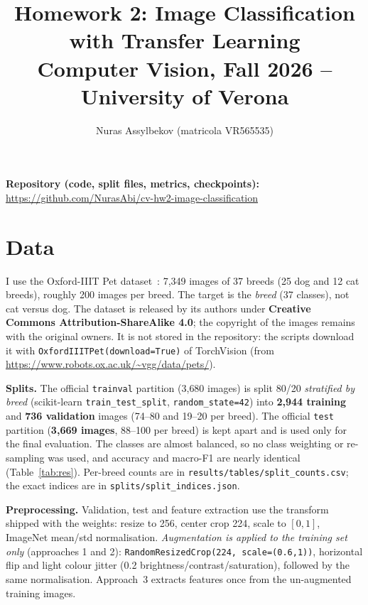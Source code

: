 \documentclass[10pt,a4paper]{article}
\title{\vspace{-1.2cm}\textbf{Homework 2: Image Classification with Transfer Learning}\\[2pt]
\large Computer Vision, Fall 2026 -- University of Verona}
\author{Nuras Assylbekov (matricola VR565535)}
\date{}
\begin{document}
\maketitle
\vspace{-0.8cm}
\noindent\textbf{Repository (code, split files, metrics, checkpoints):}\\
\url{https://github.com/NurasAbi/cv-hw2-image-classification}

\section{Data}
I use the Oxford-IIIT Pet dataset~\cite{parkhi2012}: 7{,}349 images of 37 breeds (25 dog and 12 cat breeds), roughly 200 images per breed.
The target is the \emph{breed} (37 classes), not cat versus dog. The dataset is released by its authors under
\textbf{Creative Commons Attribution-ShareAlike 4.0}; the copyright of the images remains with the original owners.
It is not stored in the repository: the scripts download it with \texttt{OxfordIIITPet(download=True)} of TorchVision
(from \url{https://www.robots.ox.ac.uk/~vgg/data/pets/}).

\textbf{Splits.} The official \texttt{trainval} partition (3{,}680 images) is split 80/20 \emph{stratified by breed}
(scikit-learn \texttt{train\_test\_split}, \texttt{random\_state=42}) into
\textbf{2{,}944 training} and \textbf{736 validation} images (74--80 and 19--20 per breed). The official \texttt{test} partition
(\textbf{3{,}669 images}, 88--100 per breed) is kept apart and is used only for the final evaluation.
The classes are almost balanced, so no class weighting or re-sampling was used, and accuracy and macro-F1 are nearly identical
(Table~\ref{tab:res}). Per-breed counts are in \texttt{results/tables/split\_counts.csv}; the exact indices are in \texttt{splits/split\_indices.json}.

\textbf{Preprocessing.} Validation, test and feature extraction use the transform shipped with the weights: resize to 256, center crop 224,
scale to $[0,1]$, ImageNet mean/std normalisation. \emph{Augmentation is applied to the training set only} (approaches 1 and 2):
\texttt{RandomResizedCrop(224, scale=(0.6,1))}, horizontal flip and light colour jitter (0.2 brightness/contrast/saturation), followed by the same normalisation.
Approach~3 extracts features once from the un-augmented training images.
\end{document}
